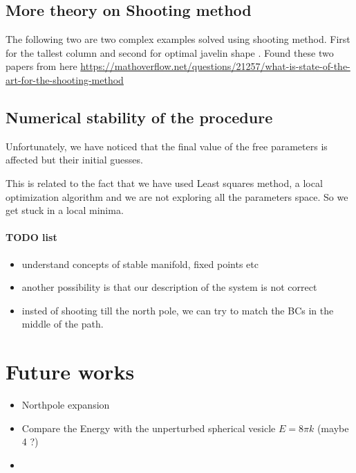 \documentclass[12pt]{article}
\begin{document}
\subsection{More theory on Shooting method}

The following two are two complex examples solved using shooting method. First for the tallest column \cite{farjounTallestColumnDynamical2008} and second for optimal javelin shape \cite{farjounOptimalShapeJavelin2007}. Found these two papers from here \url{https://mathoverflow.net/questions/21257/what-is-state-of-the-art-for-the-shooting-method}

\subsection{Numerical stability of the procedure}
Unfortunately, we have noticed that the final value of the free parameters is affected but their initial guesses. 

This is related to the fact that we have used Least squares method, a local optimization algorithm and we are not exploring all the parameters space. So we get stuck in a local minima.

\paragraph{TODO list}
\begin{itemize}
  \item understand concepts of stable manifold, fixed points etc
  \item another possibility is that our description of the system is not correct
  \item insted of shooting till the north pole, we can try to match the BCs in the middle of the path.
\end{itemize}


\section{Future works}
\begin{itemize}
  \item Northpole expansion
  \item Compare the Energy with the unperturbed spherical vesicle $E=8 \pi k$ (maybe 4 ?)
  \item 
\end{itemize}






\end{document}

